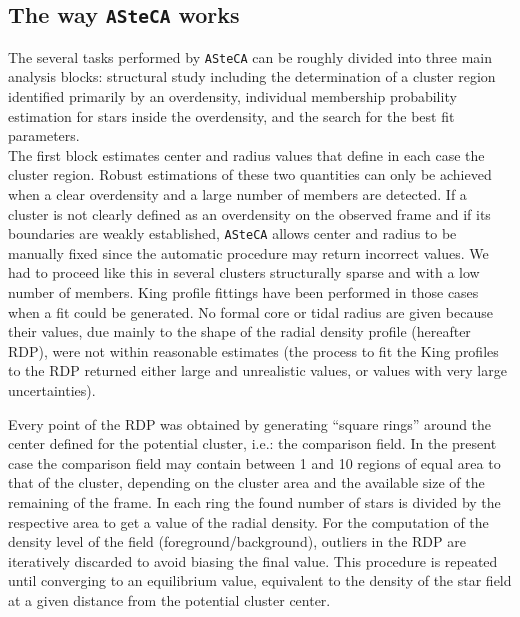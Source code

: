 \documentclass[draft]{aa}
\begin{document}
\subsection{The way \texttt{ASteCA} works}
\label{ssec:asteca_works}

The several tasks performed by \texttt{ASteCA} can be roughly divided into three
main analysis blocks: structural study including the determination of a cluster
region identified primarily by an overdensity, individual membership probability
estimation for stars inside the overdensity, and the search for the best fit
parameters.\\

The first block estimates center and radius values 
that define in each case the cluster region. Robust estimations
of these two quantities can only be achieved when a clear overdensity and a
large number of members are detected. If a cluster is not
clearly defined as an overdensity on the observed frame and if its boundaries are
weakly established, \texttt{ASteCA} allows center and radius to be manually
fixed since the automatic procedure may return incorrect values. We had to
proceed like this in several clusters structurally sparse and with a low number
of members.  King profile fittings have been performed in those cases when a
fit could be generated. No formal core or tidal radius are given because their
values, due mainly to the shape of the radial density profile (hereafter RDP),
were not within reasonable estimates (the process to fit the King profiles to
the RDP returned either large and unrealistic values, or values with very
large uncertainties).

Every point of the RDP was obtained by generating ``square rings'' around the
center defined for the potential cluster, i.e.: the comparison field.
In the present case the comparison field may contain between 1 and 10 regions
of equal area to that of the cluster, depending on the cluster area and the
available size of the remaining of the frame.
In each ring the found number of stars is divided by the respective area
to get a value of the radial density. For the computation of the density
level of the field (foreground/background), outliers in the RDP are iteratively
discarded to avoid biasing the final value. This procedure is repeated until
converging to an equilibrium value, equivalent to the density of the star field
at a given distance from the potential cluster center.\\
\end{document}
